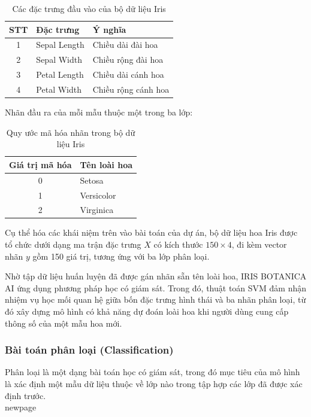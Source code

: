 \documentclass[14pt]{extarticle}
\begin{document}
	\begin{table}[ht]
		\centering
		\caption{Các đặc trưng đầu vào của bộ dữ liệu Iris}
		\label{tab:iris_features}
		\begin{tabular}{|c|l|l|}
			\hline
			\textbf{STT} & \textbf{Đặc trưng} & \textbf{Ý nghĩa} \\
			\hline
			1 & Sepal Length & Chiều dài đài hoa \\
			\hline
			2 & Sepal Width & Chiều rộng đài hoa \\
			\hline
			3 & Petal Length & Chiều dài cánh hoa \\
			\hline
			4 & Petal Width & Chiều rộng cánh hoa \\
			\hline
		\end{tabular}
	\end{table}
	
	\noindent Nhãn đầu ra của mỗi mẫu thuộc một trong ba lớp:
	
\begin{table}[ht]
	\centering
	\caption{Quy ước mã hóa nhãn trong bộ dữ liệu Iris}
	\label{tab:iris_label_encoding}
	\begin{tabular}{|c|l|}
		\hline
		\textbf{Giá trị mã hóa} & \textbf{Tên loài hoa} \\
		\hline
		0 & Setosa \\
		\hline
		1 & Versicolor \\
		\hline
		2 & Virginica \\
		\hline
	\end{tabular}
\end{table}
	
	\noindent Cụ thể hóa các khái niệm trên vào bài toán của dự án, bộ dữ liệu hoa Iris được tổ chức dưới dạng ma trận đặc trưng $X$ có kích thước $150 \times 4$, đi kèm vector nhãn $y$ gồm 150 giá trị, tương ứng với ba lớp phân loại.
	
	\noindent Nhờ tập dữ liệu huấn luyện đã được gán nhãn sẵn tên loài hoa, IRIS BOTANICA AI ứng dụng phương pháp học có giám sát. Trong đó, thuật toán SVM đảm nhận nhiệm vụ học mối quan hệ giữa bốn đặc trưng hình thái và ba nhãn phân loại, từ đó xây dựng mô hình có khả năng dự đoán loài hoa khi người dùng cung cấp thông số của một mẫu hoa mới.

	\newpage
	\subsubsection{ Bài toán phân loại (Classification) }
	\noindent Phân loại là một dạng bài toán học có giám sát, trong đó mục tiêu của mô hình là xác định một mẫu dữ liệu thuộc về lớp nào trong tập hợp các lớp đã được xác định trước.\\ newpage
	
\end{document}
